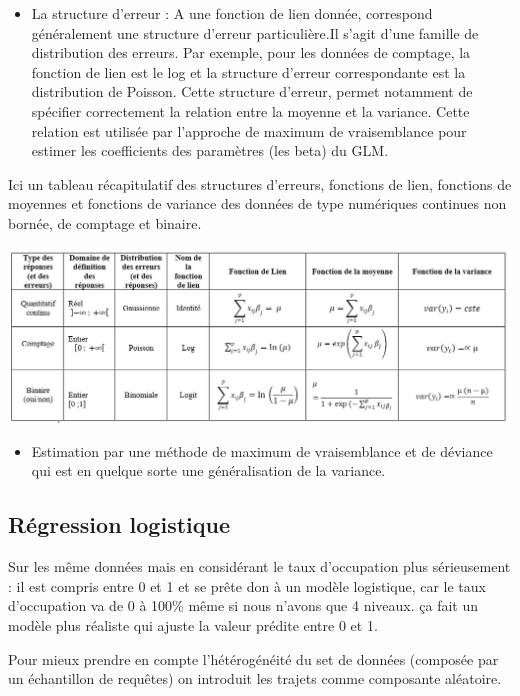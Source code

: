 \documentclass[
]{book}
\providecommand{\tightlist}{%
  \setlength{\itemsep}{0pt}\setlength{\parskip}{0pt}}
\begin{document}
\begin{itemize}
\tightlist
\item
  La structure d'erreur : A une fonction de lien donnée, correspond généralement une structure d'erreur particulière.Il s'agit d'une famille de distribution des erreurs. Par exemple, pour les données de comptage, la fonction de lien est le log et la structure d'erreur correspondante est la distribution de Poisson. Cette structure d'erreur, permet notamment de spécifier correctement la relation entre la moyenne et la variance. Cette relation est utilisée par l'approche de maximum de vraisemblance pour estimer les coefficients des paramètres (les beta) du GLM.
\end{itemize}

Ici un tableau récapitulatif des structures d'erreurs, fonctions de lien, fonctions de moyennes et fonctions de variance des données de type numériques continues non bornée, de comptage et binaire.

\includegraphics{./images/GLM.jpg}

\begin{itemize}
\tightlist
\item
  Estimation par une méthode de maximum de vraisemblance et de déviance qui est en quelque sorte une généralisation de la variance.
\end{itemize}

\hypertarget{ruxe9gression-logistique}{%
\subsection{Régression logistique}\label{ruxe9gression-logistique}}

Sur les même données mais en considérant le taux d'occupation plus sérieusement : il est compris entre 0 et 1 et se prête don à un modèle logistique, car le taux d'occupation va de 0 à 100\% même si nous n'avons que 4 niveaux. ça fait un modèle plus réaliste qui ajuste la valeur prédite entre 0 et 1.

Pour mieux prendre en compte l'hétérogénéité du set de données (composée par un échantillon de requêtes) on introduit les trajets comme composante aléatoire.
\end{document}
